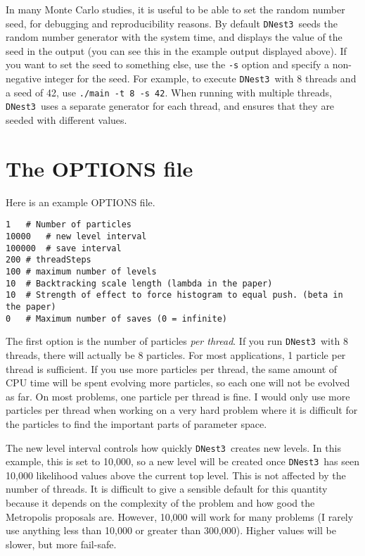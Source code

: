 \documentclass[a4paper, 11pt]{article}
\newcommand{\dnest}{{\tt DNest3}}
\begin{document}
In many Monte Carlo studies, it is useful to be able to set the random number
seed, for debugging and reproducibility reasons. By default \dnest~seeds the
random number generator with the system time, and displays the value of the
seed in the output (you can see this in the example output displayed above).
If you want to set the seed to
something else, use the {\tt -s} option and specify a non-negative integer for
the seed. For example, to execute \dnest~with
8 threads and a seed of 42, use {\tt ./main -t 8 -s 42}.
When running with multiple threads, \dnest~uses a separate generator for each
thread, and ensures that they are seeded with different values.

\section{The OPTIONS file}
Here is an example OPTIONS file.
\begin{verbatim}
1	# Number of particles
10000	# new level interval
100000	# save interval
200	# threadSteps
100	# maximum number of levels
10	# Backtracking scale length (lambda in the paper)
10	# Strength of effect to force histogram to equal push. (beta in the paper)
0	# Maximum number of saves (0 = infinite)
\end{verbatim}
The first option is the number of particles {\it per thread}. If you run
\dnest~with 8 threads, there will actually be 8 particles. For most
applications, 1 particle per thread is sufficient. If you use more particles
per thread, the same amount of CPU time will be spent evolving more particles,
so each one will not be evolved as far. On most problems, one particle per
thread is fine. I would only use more particles per thread when working on
a very hard problem where it is difficult for the particles to find the
important parts of parameter space.

The new level interval controls how quickly \dnest~creates new levels. In this
example, this is set to 10,000, so a new level will be created once \dnest~has
seen 10,000 likelihood values above the current top level. This is not affected by
the number of threads. It is difficult to give a sensible default for this
quantity because it depends on the complexity of the problem and how good
the Metropolis proposals are. However, 10,000
will work for many problems (I rarely use anything less than 10,000 or greater
than 300,000). Higher values will be slower, but more fail-safe.
\end{document}
